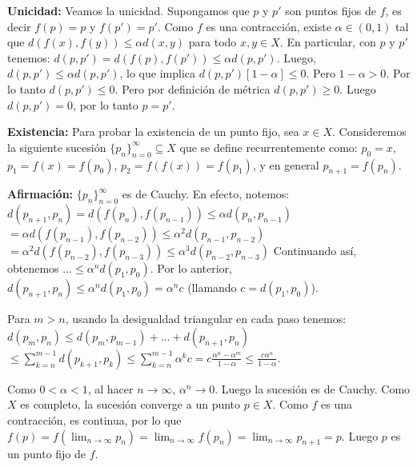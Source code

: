 \begin{dem}
\textbf{Unicidad:} Veamos la unicidad. Supongamos que $p$ y $p'$ son puntos fijos de $f$, %
es decir $f(p) = p$ y $f(p') = p'$. %
Como $f$ es una contracción, existe $\alpha \in (0, 1)$ tal que %
$d(f(x), f(y)) \le \alpha d(x, y)$ para todo $x, y \in X$. %
En particular, con $p$ y $p'$ tenemos: %
$d(p, p') = d(f(p), f(p')) \le \alpha d(p, p')$. %
Luego, $d(p, p') \le \alpha d(p, p')$, lo que implica $d(p, p')[1 - \alpha] \le 0$. %
Pero $1 - \alpha > 0$. %
Por lo tanto $d(p, p') \le 0$. Pero por definición de métrica $d(p, p') \ge 0$. %
Luego $d(p, p') = 0$, por lo tanto $p = p'$. %

\textbf{Existencia:} Para probar la existencia de un punto fijo, sea $x \in X$. %
Consideremos la siguiente sucesión $\{p_n\}_{n=0}^{\infty} \subseteq X$ que se define recurrentemente como: %
$p_0 = x$, $p_1 = f(x) = f(p_0)$, $p_2 = f(f(x)) = f(p_1)$, y en general $p_{n+1} = f(p_n)$. %

\textbf{Afirmación:} $\{p_n\}_{n=0}^{\infty}$ es de Cauchy. %
En efecto, notemos: %
$d(p_{n+1}, p_n) = d(f(p_n), f(p_{n-1})) \le \alpha d(p_n, p_{n-1})$ %
$= \alpha d(f(p_{n-1}), f(p_{n-2})) \le \alpha^2 d(p_{n-1}, p_{n-2})$ %
$= \alpha^2 d(f(p_{n-2}), f(p_{n-3})) \le \alpha^3 d(p_{n-2}, p_{n-3})$ %
Continuando así, obtenemos $\dots \le \alpha^n d(p_1, p_0)$. %
Por lo anterior, $d(p_{n+1}, p_n) \le \alpha^n d(p_1, p_0) = \alpha^n c$ (llamando $c = d(p_1, p_0)$). %

Para $m > n$, usando la desigualdad triangular en cada paso tenemos: %
$d(p_m, p_n) \le d(p_m, p_{m-1}) + \dots + d(p_{n+1}, p_n)$ %
$\le \sum_{k=n}^{m-1} d(p_{k+1}, p_k) \le \sum_{k=n}^{m-1} \alpha^k c = c \frac{\alpha^n - \alpha^m}{1 - \alpha} \le \frac{c \alpha^n}{1 - \alpha}$. %

Como $0 < \alpha < 1$, al hacer $n \to \infty$, $\alpha^n \to 0$. Luego la sucesión es de Cauchy.
Como $X$ es completo, la sucesión converge a un punto $p \in X$.
Como $f$ es una contracción, es continua, por lo que $f(p) = f(\lim_{n \to \infty} p_n) = \lim_{n \to \infty} f(p_n) = \lim_{n \to \infty} p_{n+1} = p$.
Luego $p$ es un punto fijo de $f$. %
\end{dem}